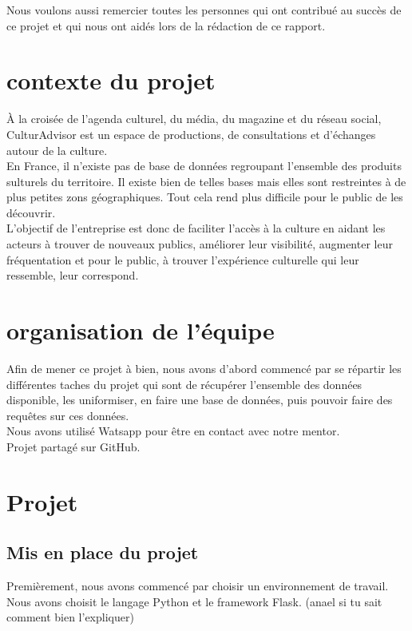 \documentclass{article}
\begin{document}
Nous voulons aussi remercier toutes les personnes qui ont contribué au succès de ce projet et qui nous ont aidés lors de la rédaction de ce rapport.
\newpage
\tableofcontents
\newpage %
\section{contexte du projet}
À la croisée de l’agenda culturel, du média, du magazine et du réseau social, CulturAdvisor est un espace de productions, de consultations et d’échanges autour de la culture. \\
En France, il n'existe pas de base de données regroupant l'ensemble des produits sulturels du territoire. Il existe bien de telles bases mais elles sont restreintes à de plus petites zons géographiques. Tout cela rend plus difficile pour le public de les découvrir. \\
L'objectif de l'entreprise est donc de faciliter l’accès à la culture en aidant les acteurs à trouver de nouveaux publics, améliorer leur visibilité, augmenter leur fréquentation et pour le public, à trouver l’expérience culturelle qui leur ressemble, leur correspond.


\section{organisation de l'équipe}
Afin de mener ce projet à bien, nous avons d'abord commencé par se répartir les différentes taches du projet qui sont de récupérer l'ensemble des données disponible, les uniformiser, en faire une base de données, puis pouvoir faire des requêtes sur ces données.\\
Nous avons utilisé Watsapp pour être en contact avec notre mentor.\\
Projet partagé sur GitHub.


\section{Projet}


\subsection{Mis en place du projet}
Premièrement, nous avons commencé par choisir un environnement de travail.\\
Nous avons choisit le langage Python et le framework Flask. (anael si tu sait comment bien l'expliquer)
\end{document}
